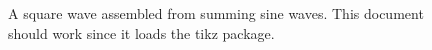 \documentclass{article}
\begin{document}
\begin{figure}
  
  \caption{A square wave assembled from summing sine waves. This document
  should work since it loads the tikz package.}
\end{figure}
\end{document}

